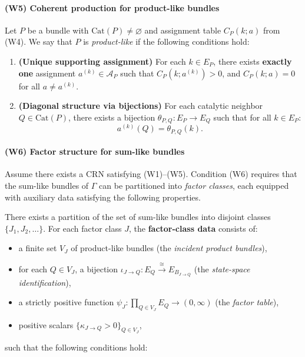 \documentclass{article}
\theoremstyle{plain}
\theoremstyle{definition}
\theoremstyle{remark}
\newcommand{\Cat}{\textrm{Cat}}
\newcommand{\<}{\langle}
\renewcommand{\>}{\rangle}
\begin{document}
\paragraph{(W5) Coherent production for product-like bundles}
Let $P$ be a bundle with $\Cat(P) \neq \varnothing$ and assignment table $C_P(k; a)$ 
from (W4). We say that $P$ is \emph{product-like} if the following conditions hold:

\begin{enumerate}
    \item \textbf{(Unique supporting assignment)} 
    For each $k \in E_P$, there exists \textbf{exactly one} assignment 
    $a^{(k)} \in \mathcal{A}_P$ such that $C_P(k; a^{(k)}) > 0$, and 
    $C_P(k; a) = 0$ for all $a \neq a^{(k)}$.
    
    \item \textbf{(Diagonal structure via bijections)} 
    For each catalytic neighbor $Q \in \Cat(P)$, there exists a bijection 
    $\theta_{P,Q} : E_P \to E_Q$ such that for all $k \in E_P$:
    \[
        a^{(k)}(Q) = \theta_{P,Q}(k).
    \]
\end{enumerate}

\noindent

\paragraph*{(W6) Factor structure for sum-like bundles}
Assume there exists a CRN satisfying (W1)--(W5). Condition (W6) requires that the sum-like bundles of $\Gamma$ 
can be partitioned into \emph{factor classes}, each equipped with auxiliary data 
satisfying the following properties.

\medskip

There exists a partition of the set of sum-like bundles into disjoint classes 
$\{J_1, J_2, \ldots\}$. For each factor class $J$, the \textbf{factor-class data} 
consists of:
\begin{itemize}
    \item a finite set $V_J$ of product-like bundles (the \emph{incident product bundles}),
    \item for each $Q \in V_J$, a bijection 
          $\iota_{J \to Q} : E_Q \xrightarrow{\cong} E_{B_{J \to Q}}$
          (the \emph{state-space identification}),
    \item a strictly positive function $\psi_J : \prod_{Q \in V_J} E_Q \to (0, \infty)$ 
          (the \emph{factor table}),
    \item positive scalars $\{\kappa_{J \to Q} > 0\}_{Q \in V_J}$,
\end{itemize}
such that the following conditions hold:
\end{document}
